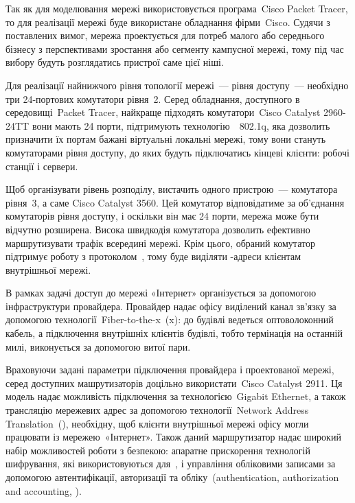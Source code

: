 \documentclass[
  ukrainian,
  simple,
  floatsection,
]{eskdnaukvd}
\begin{document}
      Так як для моделювання мережі використовується програма~\textenglish{Cisco Packet Tracer}, то для реалізації мережі буде використане обладнання фірми~\textenglish{Cisco}. Судячи з поставлених вимог, мережа проектується для потреб малого або середнього бізнесу з перспективами зростання або сегменту кампусної мережі, тому під час вибору будуть розглядатись пристрої саме цієї ніші.

      Для реалізації найнижчого рівня топології мережі~— рівня доступу~— необхідно три 24-портових комутатори рівня~2. Серед обладнання, доступного в середовищі~\textenglish{Packet Tracer}, найкраще підходять комутатори~\textenglish{Cisco Catalyst 2960-24TT} вони мають 24 порти, підтримують технологію~\textenglish{~802.1q}, яка дозволить призначити їх портам бажані віртуальні локальні мережі, тому вони стануть комутаторами рівня доступу, до яких будуть підключатись кінцеві клієнти: робочі станції і сервери.

      Щоб організувати рівень розподілу, вистачить одного пристрою~— комутатора рівня~3, а саме \textenglish{Cisco Catalyst 3560}. Цей комутатор відповідатиме за об'єднання комутаторів рівня доступу, і оскільки він має 24 порти, мережа може бути відчутно розширена. Висока швидкодія комутатора дозволить ефективно маршрутизувати трафік всередині мережі. Крім цього, обраний комутатор підтримує роботу з протоколом~\textenglish{}, тому буде виділяти \textenglish{}-адреси клієнтам внутрішньої мережі.

      В рамках задачі доступ до мережі «Інтернет» організується за допомогою інфраструктури провайдера. Провайдер надає офісу виділений канал зв'язку за допомогою технології~\textenglish{Fiber-to-the-x~(x)}: до будівлі ведеться оптоволоконний кабель, а підключення внутрішніх клієнтів будівлі, тобто термінація на останній милі, виконується за допомогою витої пари.

      Враховуючи задані параметри підключення провайдера і проектованої мережі, серед доступних машрутизаторів доцільно використати~\textenglish{Cisco Catalyst 2911}. Ця модель надає можливість підключення за технологією~\textenglish{Gigabit Ethernet}, а також трансляцію мережевих адрес за допомогою технології~\textenglish{Network Address Translation~()}, необхідну, щоб клієнти внутрішньої мережі офісу могли працювати із мережею~«Інтернет». Також даний маршрутизатор надає широкий набір можливостей роботи з безпекою: апаратне прискорення технологій шифрування, які використовуються для~\textenglish{}, і управління обліковими записами за допомогою автентифікації, авторизації та обліку~(\textenglish{authentication, authorization and accounting, }).
\end{document}
